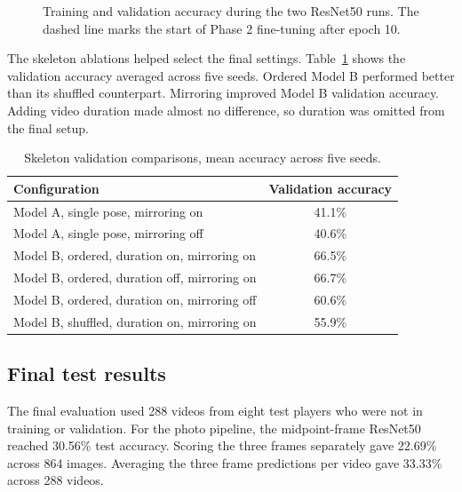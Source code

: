 \documentclass[12pt,a4paper]{article}
\begin{document}
\begin{figure}[H]
\begin{minipage}{0.48\textwidth}
\end{minipage}
\caption{Training and validation accuracy during the two ResNet50 runs. The dashed line marks the start of Phase 2 fine-tuning after epoch 10.}
\label{fig:resnet-curves}
\end{figure}

The skeleton ablations helped select the final settings. Table~\ref{tab:ablation} shows the validation accuracy averaged across five seeds. Ordered Model B performed better than its shuffled counterpart. Mirroring improved Model B validation accuracy. Adding video duration made almost no difference, so duration was omitted from the final setup.

\begin{table}[H]
\centering
\caption{Skeleton validation comparisons, mean accuracy across five seeds.}
\label{tab:ablation}
\begin{tabular}{lc}
\toprule
\textbf{Configuration} & \textbf{Validation accuracy} \\
\midrule
Model A, single pose, mirroring on & 41.1\% \\
Model A, single pose, mirroring off & 40.6\% \\
Model B, ordered, duration on, mirroring on & 66.5\% \\
Model B, ordered, duration off, mirroring on & 66.7\% \\
Model B, ordered, duration on, mirroring off & 60.6\% \\
Model B, shuffled, duration on, mirroring on & 55.9\% \\
\bottomrule
\end{tabular}
\end{table}

\subsection{Final test results}
The final evaluation used 288 videos from eight test players who were not in training or validation. For the photo pipeline, the midpoint-frame ResNet50 reached 30.56\% test accuracy. Scoring the three frames separately gave 22.69\% across 864 images. Averaging the three frame predictions per video gave 33.33\% across 288 videos.
\end{document}
